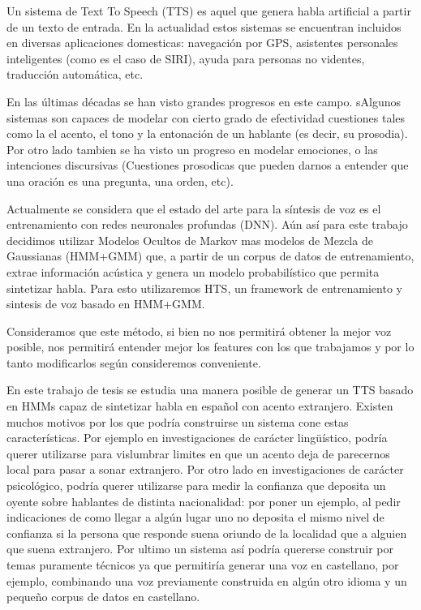 \noindent Un sistema de Text To Speech (TTS) es aquel que genera habla artificial a partir de un texto de entrada. En la actualidad estos sistemas se encuentran incluidos en diversas aplicaciones domesticas: navegación por GPS, asistentes personales inteligentes (como es el caso de SIRI), ayuda para personas no videntes, traducción automática, etc.

\noindent En las últimas décadas se han visto grandes progresos en este campo. sAlgunos sistemas son capaces de modelar con cierto grado de efectividad cuestiones tales como la el acento, el tono y la entonación de un hablante (es decir, su prosodia). Por otro lado tambien se ha visto un progreso en modelar emociones, o las intenciones discursivas (Cuestiones prosodicas que pueden darnos a entender que una oración es una pregunta, una orden, etc). 

\noindent Actualmente se considera que el estado del arte para la síntesis de voz es el entrenamiento con redes neuronales profundas (DNN). Aún así para este trabajo decidimos utilizar Modelos Ocultos de Markov mas modelos de Mezcla de Gaussianas (HMM+GMM) que, a partir de un corpus de datos de entrenamiento, extrae información acústica y genera un modelo probabilístico que permita sintetizar habla. Para esto utilizaremos HTS\cite{hts}, un framework de entrenamiento y sintesis de voz basado en HMM+GMM.

\noindent Consideramos que este método, si bien no nos permitirá obtener la mejor voz posible, nos permitirá entender mejor los features con los que trabajamos y por lo tanto modificarlos según consideremos conveniente.

\noindent En este trabajo de tesis se estudia una manera posible de generar un TTS basado en HMMs capaz de sintetizar habla en español con acento extranjero. Existen muchos motivos por los que podría construirse un sistema cone estas características. Por ejemplo en investigaciones de carácter lingüístico, podría querer utilizarse para vislumbrar limites en que un acento deja de parecernos local para pasar a sonar extranjero. Por otro lado en investigaciones de carácter psicológico, podría querer utilizarse para medir la confianza que deposita un oyente sobre hablantes de distinta nacionalidad: por poner un ejemplo, al pedir indicaciones de como llegar a algún lugar uno no deposita el mismo nivel de confianza si la persona que responde suena oriundo de la localidad que a alguien que suena extranjero. Por ultimo un sistema así podría quererse construir por temas puramente técnicos ya que permitiría generar una voz en castellano, por ejemplo, combinando una voz previamente construida en algún otro idioma y un pequeño corpus de datos en castellano.

